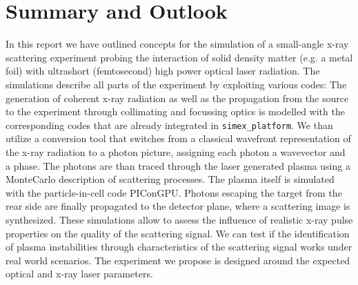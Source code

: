 \documentclass[10pt]{scrartcl}
\begin{document}
\section{Summary and Outlook}
In this report we have outlined concepts for the simulation of a small-angle
x-ray scattering experiment probing the interaction of solid density matter
(e.g. a metal foil) with ultrashort (femtosecond) high power optical laser
radiation. The simulations describe all parts of the experiment by exploiting
various codes: The generation of coherent x-ray radiation as well as the
propagation from the source to the experiment through collimating and focussing
optics is modelled with the corresponding codes that are already integrated in
\texttt{simex\_platform}. We than utilize a conversion tool that switches from a
classical wavefront representation of the x-ray radiation to a photon picture,
assigning each photon a wavevector and a phase. The photons are than traced
through the laser generated plasma using a MonteCarlo description of scattering
processes. The plasma itself
is simulated with the particle-in-cell code PIConGPU. Photons
escaping the target from the rear side are finally propagated to the detector
plane, where a scattering image is synthesized. These simulations allow to
assess the influence of realistic x-ray pulse properties on the quality of the
scattering signal. We can test if the identification of plasma
instabilities through characteristics of the scattering signal works under real
world scenarios.
The experiment we propose is designed around the expected optical and x-ray
laser parameters.
\end{document}
